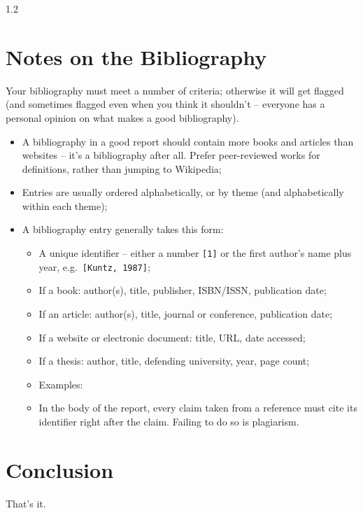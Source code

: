 \begin{spacing}{1.2}
\section{Notes on the Bibliography}
Your bibliography must meet a number of criteria; otherwise it will get
flagged (and sometimes flagged even when you think it shouldn't -- everyone
has a personal opinion on what makes a good bibliography).\\
\begin{itemize}
  \item A bibliography in a good report should contain more books and
        articles than websites -- it's a bibliography after all. Prefer
        peer-reviewed works for definitions, rather than jumping to
        Wikipedia;
  \item Entries are usually ordered alphabetically, or by theme (and
        alphabetically within each theme);
  \item A bibliography entry generally takes this form:
  \begin{itemize}
    \item A unique identifier -- either a number \texttt{[1]} or the first
          author's name plus year, e.g.\ \texttt{[Kuntz, 1987]};
    \item If a book: author(s), title, publisher, ISBN/ISSN, publication date;
    \item If an article: author(s), title, journal or conference,
          publication date;
    \item If a website or electronic document: title, URL, date accessed;
    \item If a thesis: author, title, defending university, year, page count;
    \item Examples:
    \item In the body of the report, every claim taken from a reference must
          cite its identifier right after the claim. Failing to do so is
          plagiarism.
  \end{itemize}
\end{itemize}

\section*{Conclusion}
That's it.

\end{spacing}
